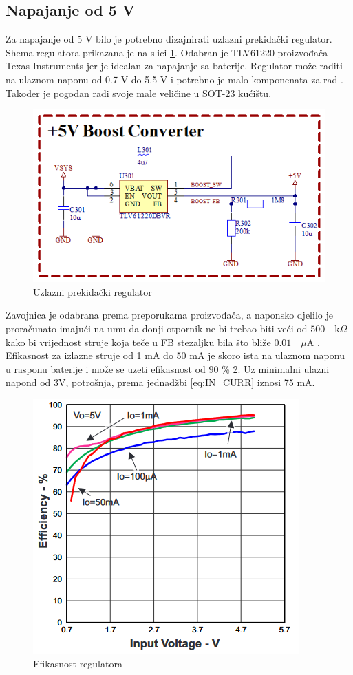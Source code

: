\subsection{Napajanje od 5 V}

Za napajanje od 5 V bilo je potrebno dizajnirati uzlazni prekidački regulator. Shema regulatora prikazana je na slici \ref{slk:BR_BOOST}. Odabran je TLV61220 proizvođača Texas Instruments jer je idealan za napajanje sa baterije. Regulator može raditi na ulaznom naponu od 0.7 V do 5.5 V i potrebno je malo komponenata za rad \cite{ti:tlv61220}. Također je pogodan radi svoje male veličine u SOT-23 kućištu.
\begin{figure}[htb]
    \centering
    \includegraphics[width=10 cm]{Figures/BR_BOOST.png}
    \caption{Uzlazni prekidački regulator}
    \label{slk:BR_BOOST}
\end{figure}
Zavojnica je odabrana prema preporukama proizvođača, a naponsko djelilo je proračunato imajući na umu da donji otpornik ne bi trebao biti veći od $500\quad \textrm{k}\Omega$ kako bi vrijednost struje koja teče u FB stezaljku bila što bliže $0.01 \quad \mu \textrm{A}$ \cite{ti:tlv61220}.
Efikasnost za izlazne struje od 1 mA do 50 mA je skoro ista na ulaznom naponu u rasponu baterije i može se uzeti efikasnost od 90 \% \ref{slk:BOOST_EFF}. Uz minimalni ulazni napond od 3V, potrošnja, prema jednadžbi \ref{eq:IN_CURR} iznosi 75 mA.
\begin{figure}[htb]
    \centering
    \includegraphics[width=8 cm]{Figures/BOOST_EFF.png}
    \caption{Efikasnost regulatora \cite{ti:tlv61220}}
    \label{slk:BOOST_EFF}
\end{figure}

